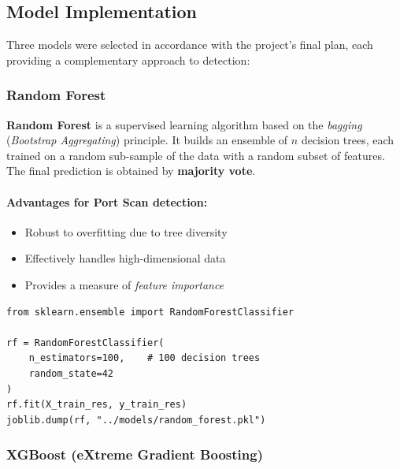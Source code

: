 
\subsection{Model Implementation}

Three models were selected in accordance with the project's final plan, each providing a complementary approach to detection:

\subsubsection{Random Forest}

\textbf{Random Forest} is a supervised learning algorithm based on the \textit{bagging} (\textit{Bootstrap Aggregating}) principle. It builds an ensemble of $n$ decision trees, each trained on a random sub-sample of the data with a random subset of features. The final prediction is obtained by \textbf{majority vote}.

\paragraph{Advantages for Port Scan detection:}
\begin{itemize}
    \item Robust to overfitting due to tree diversity
    \item Effectively handles high-dimensional data
    \item Provides a measure of \textit{feature importance}
\end{itemize}

\begin{lstlisting}[caption={Random Forest Training}]
from sklearn.ensemble import RandomForestClassifier

rf = RandomForestClassifier(
    n_estimators=100,    # 100 decision trees
    random_state=42
)
rf.fit(X_train_res, y_train_res)
joblib.dump(rf, "../models/random_forest.pkl")
\end{lstlisting}

\subsubsection{XGBoost (eXtreme Gradient Boosting)}

